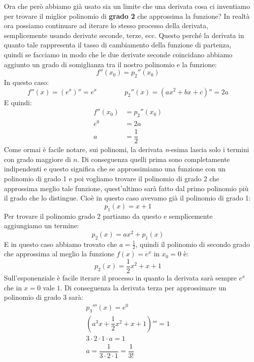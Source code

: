 Ora che però abbiamo già usato sia un limite che una derivata cosa ci 
inventiamo per trovare il miglior polinomio di \textbf{grado 2} che approssima 
la funzione? In realtà ora possiamo continuare ad iterare lo stesso processo 
della derivata, semplicemente usando derivate seconde, terze, ecc. Questo 
perché la derivata in quanto tale rappresenta il tasso di cambiamento della 
funzione di partenza, quindi se facciamo in modo che le due derivate seconde 
coincidano abbiamo aggiunto un grado di somiglianza tra il nostro polinomio e 
la funzione:
\begin{equation*}
	f''(x_0) = p_2''(x_0)
\end{equation*}
In questo caso:
\begin{equation*}
	f''(x) = (e^x)'' = e^x \qquad \qquad p_2''(x) = (ax^2 + bx + c)'' = 2a
\end{equation*}
E quindi:
\begin{align*}
	f''(x_0) &= p_2''(x_0)\\
	e^{0} & = 2a\\
	a & = \dfrac{1}{2}
\end{align*}
Come ormai è facile notare, sui polinomi, la derivata \textit{n}-esima lascia 
solo i termini con grado maggiore di $n$. Di conseguenza quelli prima sono 
completamente indipendenti e questo significa che se approssimiamo una funzione 
con un polinomio di grado 1 e poi vogliamo trovare il polinomio di grado 2 che 
approssima meglio tale funzione, quest'ultimo sarà fatto dal primo polinomio 
più il grado che lo distingue. Cioè in questo caso avevamo già il polinomio di 
grado 1: 
\begin{equation*}
	p_1(x) = x + 1
\end{equation*}
Per trovare il polinomio grado 2 partiamo da questo e semplicemente aggiungiamo 
un termine:
\begin{equation*}
	p_2(x) = ax^2 + p_1(x)
\end{equation*}
E in questo caso abbiamo trovato che $a = \frac{1}{2}$, quindi il polinomio di 
secondo grado che approssima al meglio la funzione $f(x) = e^x$ in $x_0 = 0$ è:
\begin{equation*}
	p_2(x) = \dfrac{1}{2}x^2 + x + 1
\end{equation*}
Sull'esponenziale è facile iterare il processo in quanto la derivata sarà 
sempre $e^x$ che in $x = 0$ vale $1$. Di conseguenza la derivata terza per 
approssimare un polinomio di grado 3 sarà:
\begin{gather*}
	p_3'''(x) = e^0\\
	(a^3x + \dfrac{1}{2}x^2 + x + 1)''' = 1\\
	3 \cdot 2 \cdot 1 \cdot a = 1\\
	a = \dfrac{1}{3 \cdot 2 \cdot 1} = \dfrac{1}{3!}
\end{gather*}
